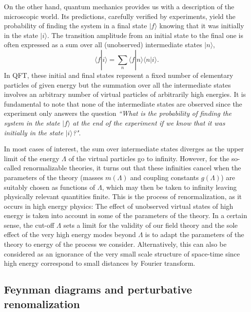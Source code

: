 \documentclass[12pt,here,feynmf]{article}
\begin{document}
On the other hand, quantum mechanics provides us with a description of the microscopic world. Its predictions, carefully verified by experiments, yield the probability of finding the system in a final state $|f\rangle$ knowing that it was initially in the state $|i\rangle$. The transition amplitude from an initial state to the final one is often expressed as a sum over all (unobserved) intermediate states $|n\rangle$,
\begin{equation}
\langle f|i\rangle=\sum_{n}\langle f|n\rangle\langle n|i\rangle.
\end{equation}
In QFT, these initial and final states represent a fixed number of elementary particles of given energy but the summation over all the intermediate states involves an arbitrary number of virtual particles of arbitrarily high energies. It is fundamental to note that none of the intermediate states are observed since the experiment only answers the question \emph{``What is the probability of finding the system in the state $|f\rangle $ at  the end of the experiment if we know that it was initially in the state $|i\rangle$?"}.  

In most cases of interest, the sum over intermediate states diverges as the upper limit of the energy $\Lambda$ of the virtual particles go to infinity. However, for the so-called renormalizable theories, it turns out that these infinities cancel  when the parameters of the theory (masses $m(\Lambda)$ and coupling constants  $g(\Lambda)$) are suitably chosen as functions of  $\Lambda$, which may then be taken to infinity leaving physically relevant quantities finite. This is the process of renormalization, as it occurs in high energy physics: The effect of unobserved virtual states of high energy is taken into account in some of the parameters of the theory. In a certain sense, the cut-off $\Lambda$ sets a limit for the validity of our field theory  and the sole effect of the very high energy modes beyond $\Lambda$ is to adapt the parameters of the theory to energy of the process we consider.  Alternatively, this can also be considered as an ignorance of the very small scale structure of space-time since high energy correspond to small distances by Fourier transform.

\subsection{Feynman diagrams and perturbative renomalization}
\end{document}
